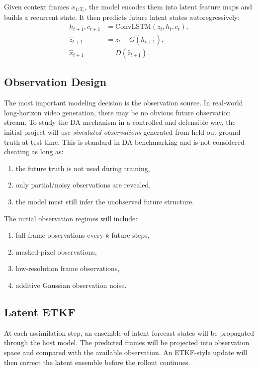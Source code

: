 \documentclass{article}
\begin{document}
Given context frames $x_{1:T_c}$, the model encodes them into latent feature maps and builds a recurrent state. It then predicts future latent states autoregressively:
\begin{align}
    h_{t+1}, c_{t+1} &= \mathrm{ConvLSTM}(z_t, h_t, c_t), \\
    \hat{z}_{t+1} &= z_t + G(h_{t+1}), \\
    \hat{x}_{t+1} &= D(\hat{z}_{t+1}).
\end{align}

\subsection{Observation Design}

The most important modeling decision is the observation source. In real-world long-horizon video generation, there may be no obvious future observation stream. To study the DA mechanism in a controlled and defensible way, the initial project will use \emph{simulated observations} generated from held-out ground truth at test time. This is standard in DA benchmarking and is not considered cheating as long as:
\begin{enumerate}[leftmargin=1.2em]
    \item the future truth is not used during training,
    \item only partial/noisy observations are revealed,
    \item the model must still infer the unobserved future structure.
\end{enumerate}

The initial observation regimes will include:
\begin{enumerate}[leftmargin=1.2em]
    \item full-frame observations every $k$ future steps,
    \item masked-pixel observations,
    \item low-resolution frame observations,
    \item additive Gaussian observation noise.
\end{enumerate}

\subsection{Latent ETKF}

At each assimilation step, an ensemble of latent forecast states will be propagated through the host model. The predicted frames will be projected into observation space and compared with the available observation. An ETKF-style update will then correct the latent ensemble before the rollout continues.
\end{document}
